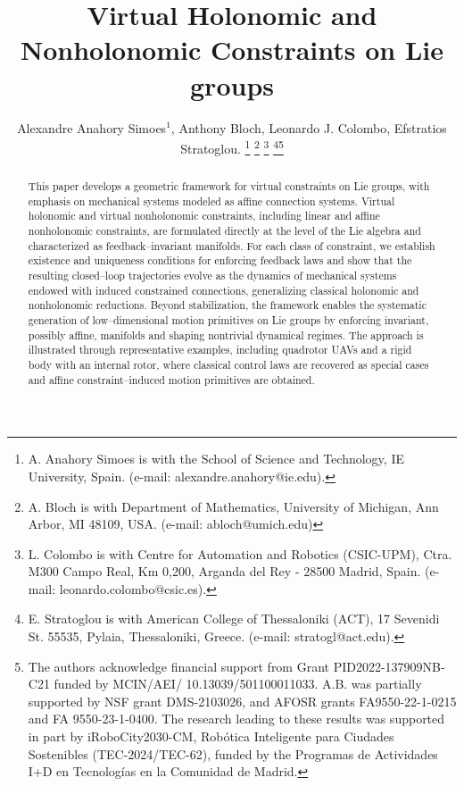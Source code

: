 \documentclass[letterpaper, 10 pt, conference]{ieeeconf}
\begin{document}
\title{Virtual Holonomic and Nonholonomic Constraints on Lie groups}

\author{Alexandre Anahory Simoes$^{1}$, Anthony Bloch, Leonardo J. Colombo, Efstratios Stratoglou.
\thanks{A. Anahory Simoes is with the School of Science and Technology, IE University, Spain. (e-mail: alexandre.anahory@ie.edu).}
\thanks{A. Bloch is with Department of Mathematics, University of Michigan, Ann Arbor, MI 48109, USA. (e-mail: abloch@umich.edu)}
\thanks{L. Colombo is with Centre for Automation and Robotics (CSIC-UPM), Ctra. M300 Campo Real, Km 0,200, Arganda del Rey - 28500 Madrid, Spain. (e-mail: leonardo.colombo@csic.es).}
\thanks{E. Stratoglou is with American College of Thessaloniki (ACT), 17 Sevenidi St.
55535, Pylaia, Thessaloniki, Greece. (e-mail: stratogl@act.edu).}\thanks{The authors acknowledge financial support from Grant PID2022-137909NB-C21 funded by MCIN/AEI/ 10.13039/501100011033. A.B. was partially supported by NSF grant  DMS-2103026, and AFOSR grants FA9550-22-1-0215 and FA 9550-23-1-0400. The research leading to these results was supported in part by iRoboCity2030-CM, Robótica Inteligente para Ciudades Sostenibles (TEC-2024/TEC-62), funded by the Programas de Actividades I+D en Tecnologías en la Comunidad de Madrid.}}

\maketitle


\begin{abstract}
This paper develops a geometric framework for virtual constraints on Lie groups, with emphasis on mechanical systems modeled as affine connection systems.
Virtual holonomic and virtual nonholonomic constraints, including linear and affine nonholonomic constraints, are formulated directly at the level of the Lie algebra and characterized as feedback--invariant manifolds.
For each class of constraint, we establish existence and uniqueness conditions for enforcing feedback laws and show that the resulting closed--loop trajectories evolve as the dynamics of mechanical systems endowed with induced constrained connections, generalizing classical holonomic and nonholonomic reductions.
Beyond stabilization, the framework enables the systematic generation of low--dimensional motion primitives on Lie groups by enforcing invariant, possibly affine, manifolds and shaping nontrivial dynamical regimes.
The approach is illustrated through representative examples, including quadrotor UAVs and a rigid body with an internal rotor, where classical control laws are recovered as special cases and affine constraint--induced motion primitives are obtained.
\end{abstract}
\end{document}
